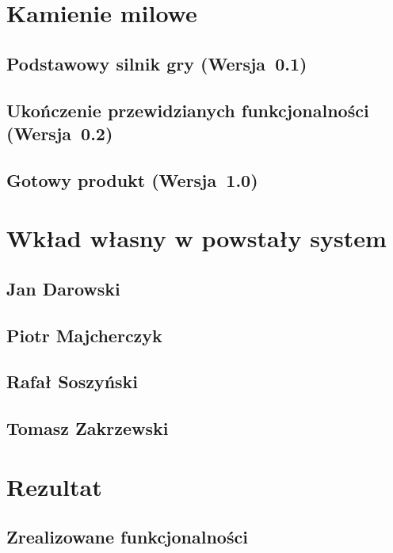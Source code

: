 \documentclass[licencjacka]{pracamgr}
\begin{document}
\chapter{Kamienie milowe}

  \section{Podstawowy silnik gry (Wersja~0.1)}
  
  \section{Ukończenie przewidzianych funkcjonalności (Wersja~0.2)}
  
  \section{Gotowy produkt (Wersja~1.0)}

\chapter{Wkład własny w powstały system}

  \section{Jan Darowski}

  \section{Piotr Majcherczyk}

  \section{Rafał Soszyński}

  \section{Tomasz Zakrzewski}

\chapter{Rezultat}

  \section{Zrealizowane funkcjonalności}
\end{document}
